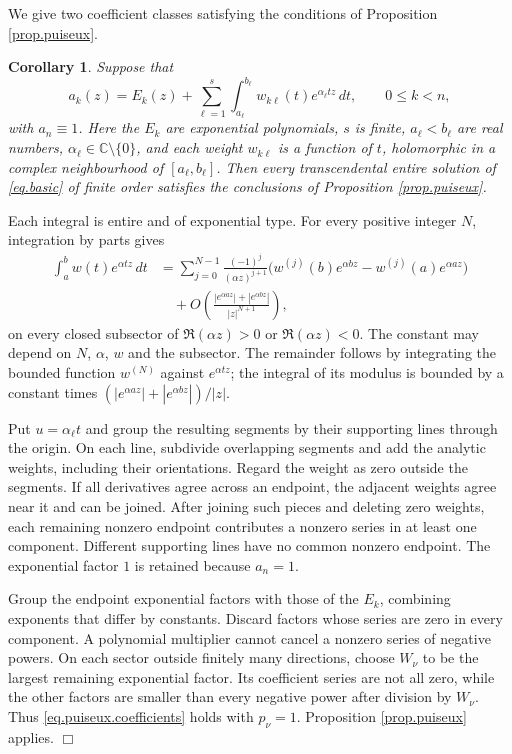 \documentclass[a4paper,12pt]{article}
\newcommand{\C}{\mathbb{C}}
\newtheorem{corollary}[defin]{Corollary}
\newenvironment{proof}
{\noindent{\it Proof.}}{\hfill $\Box$\par\vspace{2.5mm}}
\numberwithin{equation}{section}
\begin{document}
We give two coefficient classes satisfying the conditions of
Proposition \ref{prop.puiseux}.

\begin{corollary}\label{cor.analytic.weights}
Suppose that
\begin{equation}\label{eq.analytic.weight.coefficients}
 a_k(z)=E_k(z)+\sum_{\ell=1}^{s}
       \int_{a_\ell}^{b_\ell}w_{k\ell}(t)e^{\alpha_\ell tz}\,dt,
 \qquad 0\le k<n,
\end{equation}
with $a_n\equiv1$.
Here the $E_k$ are exponential polynomials, $s$ is finite,
$a_\ell<b_\ell$ are real numbers, $\alpha_\ell\in\C\setminus\{0\}$,
and each weight $w_{k\ell}$ is a function of $t$, holomorphic
in a complex neighbourhood of $[a_\ell,b_\ell]$.
Then every transcendental entire solution of \eqref{eq.basic}
of finite order satisfies the conclusions of Proposition
\ref{prop.puiseux}.
\end{corollary}
\begin{proof}
Each integral is entire and of exponential type.
For every positive integer $N$, integration by parts gives
\begin{equation}\label{eq.analytic.weight.expansion}
 \begin{aligned}
 \int_a^b w(t)e^{\alpha tz}\,dt
 &=\sum_{j=0}^{N-1}\frac{(-1)^j}{(\alpha z)^{j+1}}
       \bigl(w^{(j)}(b)e^{\alpha bz}
                    -w^{(j)}(a)e^{\alpha az}\bigr)\\
 &\quad+O\!\left(
       \frac{|e^{\alpha az}|+|e^{\alpha bz}|}{|z|^{N+1}}\right),
 \end{aligned}
\end{equation}
on every closed subsector of $\Re(\alpha z)>0$ or
$\Re(\alpha z)<0$. The constant may depend on $N$, $\alpha$, $w$
and the subsector. The remainder follows by integrating the bounded
function $w^{(N)}$ against $e^{\alpha tz}$; the integral of its modulus
is bounded by a constant times
$(|e^{\alpha az}|+|e^{\alpha bz}|)/|z|$.

Put $u=\alpha_\ell t$ and group the resulting segments by their
supporting lines through the origin. On each line, subdivide overlapping
segments and add the analytic weights, including their orientations.
Regard the weight as zero outside the segments.
If all derivatives agree across an endpoint, the adjacent weights
agree near it and can be joined.
After joining such pieces and deleting zero weights, each remaining
nonzero endpoint contributes a nonzero series in at least one component.
Different supporting lines have no common nonzero endpoint.
The exponential factor $1$ is retained because $a_n=1$.

Group the endpoint exponential factors with those of the $E_k$,
combining exponents that differ by constants.
Discard factors whose series are zero in every component.
A polynomial multiplier cannot cancel a nonzero series of negative
powers. On each sector outside finitely many directions, choose
$W_\nu$ to be the largest remaining exponential factor.
Its coefficient series are not all zero, while the other factors are
smaller than every negative power after division by $W_\nu$.
Thus \eqref{eq.puiseux.coefficients} holds with $p_\nu=1$.
Proposition \ref{prop.puiseux} applies.
\end{proof}
\end{document}
